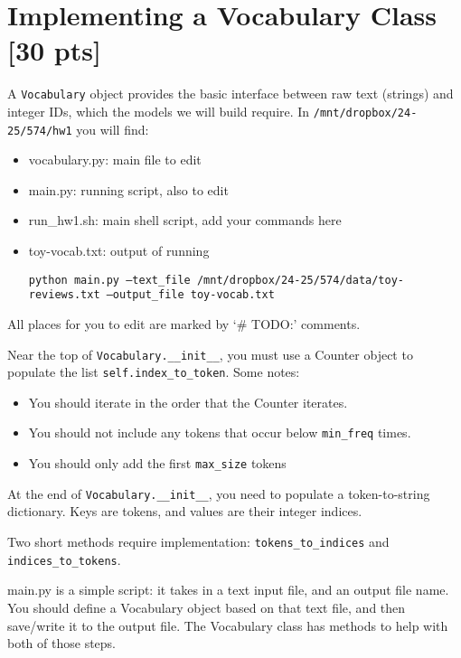 \documentclass[11pt]{article}
\begin{document}
\section{Implementing a Vocabulary Class [30 pts]}

A \texttt{Vocabulary} object provides the basic interface between raw text (strings) and integer IDs, which the models we will build require.  In \texttt{/mnt/dropbox/24-25/574/hw1} you will find:
\begin{itemize}
  \item vocabulary.py: main file to edit
  \item main.py: running script, also to edit
  \item run\_hw1.sh: main shell script, add your commands here
  \item toy-vocab.txt: output of running 
  
    \texttt{python main.py --text\_file /mnt/dropbox/24-25/574/data/toy-reviews.txt --output\_file toy-vocab.txt}
\end{itemize}
All places for you to edit are marked by `\# TODO:' comments.

\vspace{2em}
 Near the top of \texttt{Vocabulary.\_\_init\_\_}, you must use a Counter object to populate the list \texttt{self.index\_to\_token}.  Some notes:
\begin{itemize}
  \item You should iterate in the order that the Counter iterates.
  \item You should not include any tokens that occur below \texttt{min\_freq} times.
  \item You should only add the first \texttt{max\_size} tokens
\end{itemize}

\vspace{2em}
  At the end of \texttt{Vocabulary.\_\_init\_\_}, you need to populate a token-to-string dictionary.  Keys are tokens, and values are their integer indices.

\vspace{2em}
  Two short methods require implementation: \texttt{tokens\_to\_indices} and \texttt{indices\_to\_tokens}.

\vspace{2em}
  main.py is a simple script: it takes in a text input file, and an output file name.  You should define a Vocabulary object based on that text file, and then save/write it to the output file.  The Vocabulary class has methods to help with both of those steps.
\end{document}
